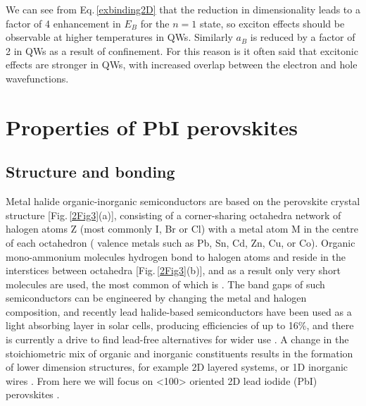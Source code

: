 We can see from Eq.\,\ref{exbinding2D} that the reduction in dimensionality leads to a factor of 4 enhancement in $E_B$ for the $n=1$ state, so exciton effects should be observable at higher temperatures in QWs. Similarly $a_B$ is reduced by a factor of 2 in QWs as a result of confinement. For this reason is it often said that excitonic effects are stronger in QWs, with increased overlap between the electron and hole wavefunctions.

\section{Properties of PbI perovskites}
\subsection{Structure and bonding}
Metal halide  organic-inorganic semiconductors are based on the  perovskite crystal structure [Fig.\,\ref{2Fig3}(a)], consisting of a corner-sharing octahedra network of halogen atoms Z (most commonly I, Br or Cl) with a metal atom M in the centre of each octahedron ( valence metals such as Pb, Sn, Cd, Zn, Cu, or Co). Organic mono-ammonium molecules  hydrogen bond to halogen atoms and reside in the interstices between octahedra [Fig.\,\ref{2Fig3}(b)], and as a result only very short molecules are used, the most common of which is . The band gaps of such semiconductors can be engineered by changing the metal and halogen composition, and recently lead halide-based semiconductors have been used as a light absorbing layer in solar cells, producing efficiencies of up to 16\%, and there is currently a drive to find lead-free alternatives for wider use \cite{Lee2012, Heo2013, Liu2013, Hao2014}. A change in the stoichiometric mix of organic and inorganic constituents results in the formation of lower dimension structures, for example 2D layered systems, or 1D inorganic wires \cite{Nagami1996, Fukumoto2000, Fujisawa2004, Pradeesh2010}. From here we will focus on <100> oriented 2D lead iodide (PbI) perovskites \cite{Mitzi2001}.

